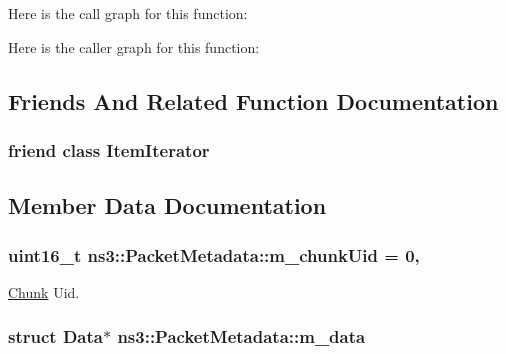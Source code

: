 Here is the call graph for this function\+:




Here is the caller graph for this function\+:




\subsection{Friends And Related Function Documentation}
\subsubsection[{\texorpdfstring{Item\+Iterator}{ItemIterator}}]{\setlength{\rightskip}{0pt plus 5cm}friend class {\bf Item\+Iterator}\hspace{0.3cm}{\ttfamily [friend]}}\hypertarget{classns3_1_1PacketMetadata_a32606143b9dd3fe0db01264200e27783}{}\label{classns3_1_1PacketMetadata_a32606143b9dd3fe0db01264200e27783}


\subsection{Member Data Documentation}
\subsubsection[{\texorpdfstring{m\+\_\+chunk\+Uid}{m_chunkUid}}]{\setlength{\rightskip}{0pt plus 5cm}uint16\+\_\+t ns3\+::\+Packet\+Metadata\+::m\+\_\+chunk\+Uid = 0\hspace{0.3cm}{\ttfamily [static]}, {\ttfamily [private]}}\hypertarget{classns3_1_1PacketMetadata_a98e20e3da84be30e3ff4b1761f215cbd}{}\label{classns3_1_1PacketMetadata_a98e20e3da84be30e3ff4b1761f215cbd}


\hyperlink{classns3_1_1Chunk}{Chunk} Uid. 

\subsubsection[{\texorpdfstring{m\+\_\+data}{m_data}}]{\setlength{\rightskip}{0pt plus 5cm}struct {\bf Data}$\ast$ ns3\+::\+Packet\+Metadata\+::m\+\_\+data\hspace{0.3cm}{\ttfamily [private]}}\hypertarget{classns3_1_1PacketMetadata_a6a7206086aec2a73a094fe072650b9ee}{}\label{classns3_1_1PacketMetadata_a6a7206086aec2a73a094fe072650b9ee}


